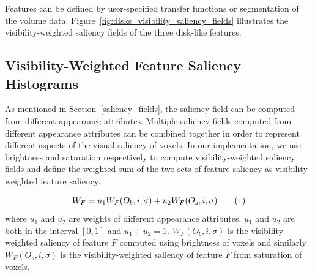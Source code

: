 Features can be defined by user-specified transfer functions or segmentation of the volume data.
Figure~\ref{fig:disks_visibility_saliency_fields} illustrates the visibility-weighted saliency fields of the three disk-like features.

\subsection{Visibility-Weighted Feature Saliency Histograms \label{weighted_feature_saliency}}
As mentioned in Section~\ref{saliency_fields}, the saliency field can be computed from different appearance attributes.
Multiple saliency fields computed from different appearance attributes can be combined together in order to represent different aspects of the visual saliency of voxels.
In our implementation, we use brightness and saturation respectively to compute visibility-weighted saliency fields and define the weighted sum of the two sets of feature saliency as visibility-weighted feature saliency.


\[ W_{F}=u_{1}W_{F}(O_{b},i,\sigma)+u_{2}W_{F}(O_{s},i,\sigma)
\addtag \]
where $ u_{1}$ and $ u_{2}$ are weights of different appearance attributes. $ u_{1}$ and $ u_{2}$ are both in the interval $[0,1] $ and $ u_{1}+u_{2}=1 $. $ W_{F}(O_{b},i,\sigma) $ is the visibility-weighted saliency of feature $ F $ computed using brightness of voxels and similarly $ W_{F}(O_{s},i,\sigma) $ is the visibility-weighted saliency of feature $ F $ from saturation of voxels.

